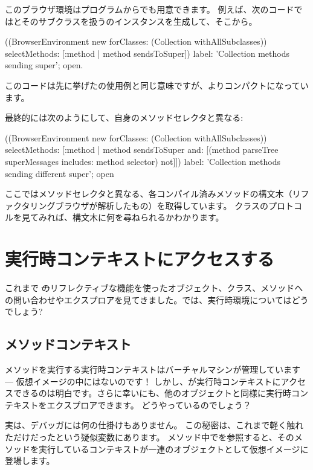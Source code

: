 \documentclass[a4paper,10pt,twoside]{book}
\begin{document}
このブラウザ環境はプログラムからでも用意できます。
例えば、次のコードではとそのサブクラスを扱うのインスタンスを生成して、そこから。
\begin{code}{}
((BrowserEnvironment new forClasses: (Collection withAllSubclasses))
	selectMethods: [:method | method sendsToSuper])
	label: 'Collection methods sending super';
	open.
\end{code}{}

このコードは先に挙げたの使用例と同じ意味ですが、よりコンパクトになっています。

最終的には次のようにして、自身のメソッドセレクタと異なる:
\begin{code}{}
((BrowserEnvironment new forClasses: (Collection withAllSubclasses))
	selectMethods: [:method | 
		method sendsToSuper
		and: [(method parseTree superMessages includes: method selector) not]])
	label: 'Collection methods sending different super';
	open
\end{code}
ここではメソッドセレクタと異なる、各コンパイル済みメソッドの構文木（リファクタリングブラウザが解析したもの）を取得しています。
クラスのプロトコルを見てみれば、構文木に何を尋ねられるかわかります。

\section{実行時コンテキストにアクセスする}

これまで \st のリフレクティブな機能を使ったオブジェクト、クラス、メソッドへの問い合わせやエクスプロアを見てきました。では、実行時環境についてはどうでしょう?

\subsection{メソッドコンテキスト}

メソッドを実行する実行時コンテキストはバーチャルマシンが管理しています --- 仮想イメージの中にはないのです！
しかし、が実行時コンテキストにアクセスできるのは明白です。さらに幸いにも、他のオブジェクトと同様に実行時コンテキストをエクスプロアできます。
どうやっているのでしょう？

実は、デバッガには何の仕掛けもありません。
この秘密は、これまで軽く触れただけだったという疑似変数にあります。
メソッド中でを参照すると、そのメソッドを実行しているコンテキストが一連のオブジェクトとして仮想イメージに登場します。
\end{document}
